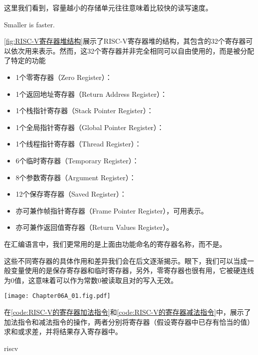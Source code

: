 这里我们看到，容量越小的存储单元往往意味着比较快的读写速度。
\begin{BoxDesignPrinciple}[越小越快]
    \centering
    Smaller is faster.
\end{BoxDesignPrinciple}
\cref{fig:RISC-V寄存器堆结构}展示了RISC-V寄存器堆的结构，其包含的32个寄存器可以依次用来表示。然而，这32个寄存器并非完全相同可以自由使用的，而是被分配了特定的功能
\begin{itemize}
    \item 1个零寄存器（Zero Register）：
    \item 1个返回地址寄存器（Return Address Register）：
    \item 1个栈指针寄存器（Stack Pointer Register）：
    \item 1个全局指针寄存器（Global Pointer Register）：
    \item 1个线程指针寄存器（Thread Register）：
    \item 6个临时寄存器（Temporary Register）：
    \item 8个参数寄存器（Argument Register）：
    \item 12个保存寄存器（Saved Register）：
    \item {} 亦可兼作帧指针寄存器（Frame Pointer Register），可用表示。
    \item {} 亦可兼作返回值寄存器（Return Values Register）。
\end{itemize}

在汇编语言中，我们更常用的是上面由功能命名的寄存器名称，而不是。

这些不同寄存器的具体作用和差异我们会在后文逐渐揭示。眼下，我们可以当成一般变量使用的是保存寄存器和临时寄存器，另外，零寄存器也很有用，它被硬连线为$0$值，这意味着可以作为常数$0$被读取且对的写入无效。

\begin{Figure}
    \texttt{[image: Chapter06A\_01.fig.pdf]}
\end{Figure}

在\cref{code:RISC-V的寄存器加法指令}和\cref{code:RISC-V的寄存器减法指令}中，展示了加法指令和减法指令的操作，两者分别将寄存器（假设寄存器中已存有恰当的值）求和或求差，并将结果存入寄存器中。
\begin{Code}{riscv}
    
\end{Code}

